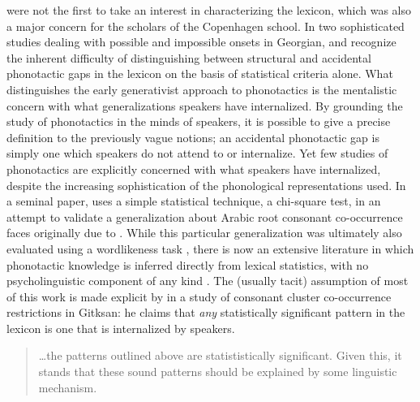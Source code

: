 \citeauthor{Chomsky1965} were not the first to take an interest in characterizing the lexicon, which was also a major concern for the scholars of the Copenhagen school. In two sophisticated studies dealing with possible and impossible onsets in Georgian, \citet{Fischer-Jorgensen1952} and \citet{Vogt1954} recognize the inherent difficulty of distinguishing between structural and accidental phonotactic gaps in the lexicon on the basis of statistical criteria alone. What distinguishes the early generativist approach to phonotactics is the mentalistic concern with what generalizations speakers have internalized. By grounding the study of phonotactics in the minds of speakers, it is possible to give a precise definition to the previously vague notions; an accidental phonotactic gap is simply one which speakers do not attend to or internalize. Yet few studies of phonotactics are explicitly concerned with what speakers have internalized, despite the increasing sophistication of the phonological representations used. In a seminal paper, \citet{McCarthy1988} uses a simple statistical technique, a chi-square test, in an attempt to validate a generalization about Arabic root consonant co-occurrence faces originally due to \citet{Greenberg1950}. While this particular generalization was ultimately also evaluated using a wordlikeness task \citep{Frisch2004}, there is now an extensive literature in which phonotactic knowledge is inferred directly from lexical statistics, with no psycholinguistic component of any kind 
\citep[e.g.,][]{Anttila2008,
Berkley1994b,Berkley1994a,Berkley2000,
Brown2010,
Buckley1997,
Coetzee2008a,
Dmitrieva2008a,Dmitrieva2008b,
Elmedlaoui1995,
Graff2011,
Padgett1992,Padgett1995,
MacEachern1999,
Kinney2005,
Kawahara2006,
Martin2007,Martin2011,
Mester1988,
Miller-Ockhuizen2003,
Pozdniakov2007,
Yip1989}.
The (usually tacit) assumption of most of this work is made explicit by \citet{Brown2010} in a study of consonant cluster co-occurrence restrictions in Gitksan: he claims that \emph{any} statistically significant pattern in the lexicon is one that is internalized by speakers. 

\begin{quote}
\ldots{}the patterns outlined above are statististically significant. Given this, it stands that these sound patterns should be explained by some linguistic mechanism. \citep[][48]{Brown2010}
\end{quote}

